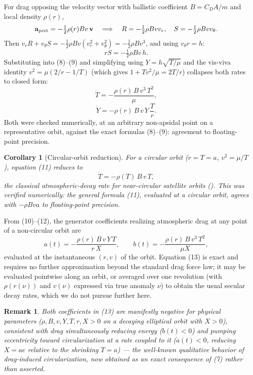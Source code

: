 \documentclass[11pt]{amsart}
\newtheorem{corollary}[theorem]{Corollary}
\newtheorem*{remark}{Remark}
\begin{document}
For drag opposing the velocity vector with ballistic coefficient $B=C_DA/m$ and local density $\rho(r)$,
\[
\mathbf a_{\rm pert}=-\tfrac12\rho(r)Bv\,\mathbf v \quad\Longrightarrow\quad R=-\tfrac12\rho Bvv_r,\quad S=-\tfrac12\rho Bvv_\theta.
\]
Then $v_rR+v_\theta S=-\tfrac12\rho Bv(v_r^2+v_\theta^2)=-\tfrac12\rho Bv^3$, and using $v_\theta r=h$:
\[
rS=-\tfrac12\rho Bv\,h.
\]
Substituting into (8)--(9) and simplifying using $Y=h\sqrt{T/\mu}$ and the vis-viva identity $v^2=\mu(2/r-1/T)$ (which gives $1+Tv^2/\mu=2T/r$) collapses both rates to closed form:
\begin{equation}
\dot T=-\frac{\rho(r)\,B\,v^3\,T^2}{\mu}, \tag{11}
\end{equation}
\begin{equation}
\dot Y=-\rho(r)\,B\,v\,Y\,\frac{T}{r}. \tag{12}
\end{equation}
Both were checked numerically, at an arbitrary non-apsidal point on a representative orbit, against the exact formulas (8)--(9): agreement to floating-point precision.

\begin{corollary}[Circular-orbit reduction]
For a circular orbit ($r=T=a$, $v^2=\mu/T$), equation (11) reduces to
\[
\dot T=-\rho(T)\,B\,v\,T,
\]
the classical atmospheric-decay rate for near-circular satellite orbits \textup{(\cite{KingHele1964})}. This was verified numerically: the general formula (11), evaluated at a circular orbit, agrees with $-\rho Bva$ to floating-point precision.
\end{corollary}

From (10)--(12), the generator coefficients realizing atmospheric drag at any point of a non-circular orbit are
\begin{equation}
a(t)=-\frac{\rho(r)\,B\,v\,Y\,T}{r\,X},\qquad b(t)=-\frac{\rho(r)\,B\,v^3\,T^2}{\mu X}, \tag{13}
\end{equation}
evaluated at the instantaneous $(r,v)$ of the orbit. Equation (13) is exact and requires no further approximation beyond the standard drag force law; it may be evaluated pointwise along an orbit, or averaged over one revolution (with $\rho(r(\nu))$ and $v(\nu)$ expressed via true anomaly $\nu$) to obtain the usual secular decay rates, which we do not pursue further here.

\begin{remark}
Both coefficients in (13) are manifestly negative for physical parameters ($\rho,B,v,Y,T,r,X>0$ on a decaying elliptical orbit with $X>0$), consistent with drag simultaneously reducing energy ($b(t)<0$) and pumping eccentricity toward circularization at a rate coupled to it ($a(t)<0$, reducing $X=ae$ relative to the shrinking $T=a$) --- the well-known qualitative behavior of drag-induced circularization, now obtained as an exact consequence of (7) rather than asserted.
\end{remark}
\end{document}
